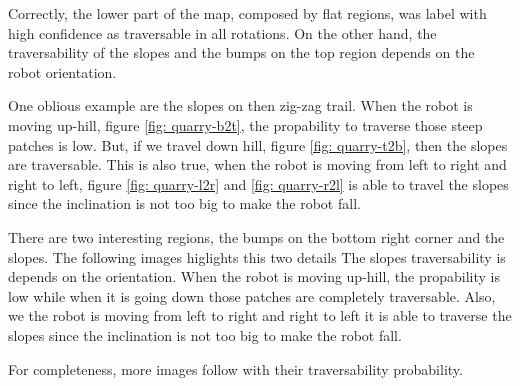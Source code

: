 \documentclass[../document.tex]{subfiles}
\begin{document}
 Correctly, the lower part of the map, composed by flat regions, was label with high confidence as traversable in all rotations. On the other hand, the traversability of the  slopes and the bumps on the top region depends on the robot orientation.
 
 One oblious example are the slopes on then zig-zag trail. When the robot is moving up-hill, figure \ref{fig: quarry-b2t}, the propability to traverse those steep patches is low. But, if we travel down hill, figure \ref{fig: quarry-t2b}, then the slopes are traversable. This is also true, when the robot is moving from left to right and right to left, figure \ref{fig: quarry-l2r} and \ref{fig: quarry-r2l} is able to travel the slopes since the inclination is not too big to make the robot fall. 
 
 There are two interesting regions, the bumps on the bottom right corner and the slopes. The following images higlights this two details
The slopes traversability is depends on the orientation. When the robot is moving up-hill, the propability is low while when it is going down those patches are completely traversable. Also, we the robot is moving from left to right and right to left it is able to traverse the slopes since the inclination is not too big to make the robot fall. 

For completeness, more images follow with their traversability probability.
\end{document}

